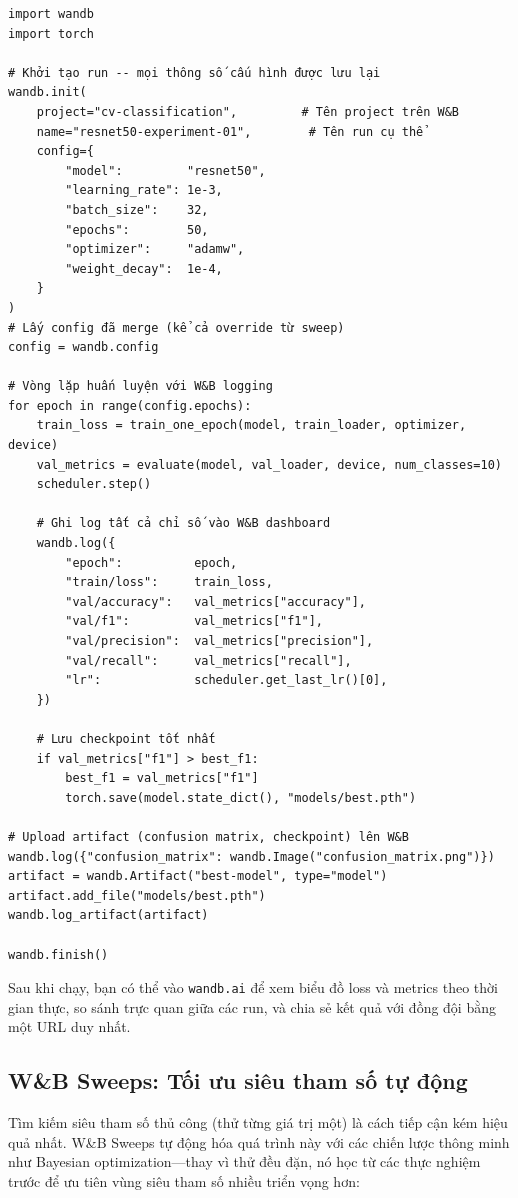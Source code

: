\begin{verbatim}
import wandb
import torch

# Khởi tạo run -- mọi thông số cấu hình được lưu lại
wandb.init(
    project="cv-classification",         # Tên project trên W&B
    name="resnet50-experiment-01",        # Tên run cụ thể
    config={
        "model":         "resnet50",
        "learning_rate": 1e-3,
        "batch_size":    32,
        "epochs":        50,
        "optimizer":     "adamw",
        "weight_decay":  1e-4,
    }
)
# Lấy config đã merge (kể cả override từ sweep)
config = wandb.config

# Vòng lặp huấn luyện với W&B logging
for epoch in range(config.epochs):
    train_loss = train_one_epoch(model, train_loader, optimizer, device)
    val_metrics = evaluate(model, val_loader, device, num_classes=10)
    scheduler.step()

    # Ghi log tất cả chỉ số vào W&B dashboard
    wandb.log({
        "epoch":          epoch,
        "train/loss":     train_loss,
        "val/accuracy":   val_metrics["accuracy"],
        "val/f1":         val_metrics["f1"],
        "val/precision":  val_metrics["precision"],
        "val/recall":     val_metrics["recall"],
        "lr":             scheduler.get_last_lr()[0],
    })

    # Lưu checkpoint tốt nhất
    if val_metrics["f1"] > best_f1:
        best_f1 = val_metrics["f1"]
        torch.save(model.state_dict(), "models/best.pth")

# Upload artifact (confusion matrix, checkpoint) lên W&B
wandb.log({"confusion_matrix": wandb.Image("confusion_matrix.png")})
artifact = wandb.Artifact("best-model", type="model")
artifact.add_file("models/best.pth")
wandb.log_artifact(artifact)

wandb.finish()
\end{verbatim}

Sau khi chạy, bạn có thể vào \texttt{wandb.ai} để xem biểu đồ loss và metrics theo thời gian thực, so sánh trực quan giữa các run, và chia sẻ kết quả với đồng đội bằng một URL duy nhất.

\subsection*{W\&B Sweeps: Tối ưu siêu tham số tự động}

Tìm kiếm siêu tham số thủ công (thử từng giá trị một) là cách tiếp cận kém hiệu quả nhất. W\&B Sweeps tự động hóa quá trình này với các chiến lược thông minh như Bayesian optimization---thay vì thử đều đặn, nó học từ các thực nghiệm trước để ưu tiên vùng siêu tham số nhiều triển vọng hơn:

